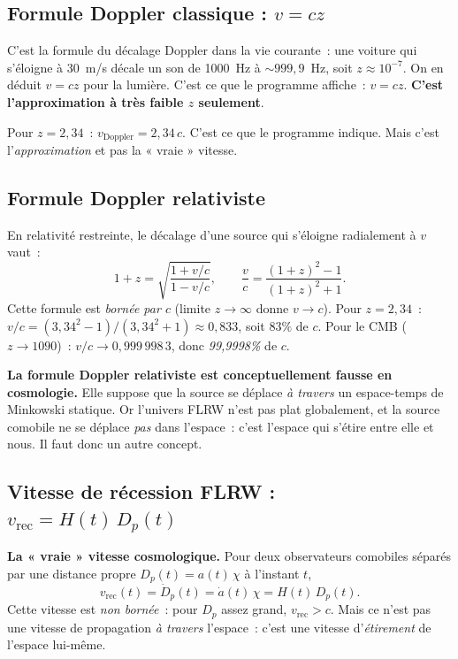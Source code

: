 \documentclass[11pt,a4paper,openany]{report}
\begin{document}
\subsection{Formule Doppler classique : $v = cz$}

\begin{tcolorbox}[vulgarisation]
C'est la formule du décalage Doppler dans la vie courante~: une voiture qui
s'éloigne à $30$~m/s décale un son de 1000~Hz à $\sim 999{,}9$~Hz, soit
$z\approx 10^{-7}$. On en déduit $v = cz$ pour la lumière. C'est ce que le
programme affiche~: $v = cz$. \textbf{C'est l'approximation à très faible $z$
seulement}.
\end{tcolorbox}

Pour $z=2{,}34$~: $v_{\text{Doppler}} = 2{,}34\,c$. C'est ce que le programme
indique. Mais c'est l'\emph{approximation} et pas la « vraie » vitesse.

\subsection{Formule Doppler relativiste}

En relativité restreinte, le décalage d'une source qui s'éloigne radialement
à $v$ vaut~:
\[
1 + z = \sqrt{\frac{1 + v/c}{1 - v/c}}, \qquad
\frac{v}{c} = \frac{(1+z)^{2} - 1}{(1+z)^{2} + 1}.
\]
Cette formule est \emph{bornée par $c$} (limite $z \to \infty$ donne $v\to c$).
Pour $z=2{,}34$~: $v/c = (3{,}34^{2}-1)/(3{,}34^{2}+1) \approx 0{,}833$, soit
$83\%$ de $c$. Pour le CMB ($z\to 1090$)~: $v/c \to 0{,}999\,998\,3$, donc
\emph{99{,}9998\%} de $c$.

\begin{tcolorbox}[attention]
\textbf{La formule Doppler relativiste est conceptuellement fausse en
cosmologie.} Elle suppose que la source se déplace \emph{à travers} un
espace-temps de Minkowski statique. Or l'univers FLRW n'est pas plat
globalement, et la source comobile ne se déplace \emph{pas} dans l'espace~:
c'est l'espace qui s'étire entre elle et nous. Il faut donc un autre concept.
\end{tcolorbox}

\subsection{Vitesse de récession FLRW : $v_{\text{rec}} = H(t)\,D_p(t)$}

\begin{tcolorbox}[mathspe]
\textbf{La « vraie » vitesse cosmologique.} Pour deux observateurs comobiles
séparés par une distance propre $D_p(t) = a(t)\,\chi$ à l'instant $t$,
\[
v_{\text{rec}}(t) = \dot D_p(t) = \dot a(t)\,\chi = H(t)\,D_p(t).
\]
Cette vitesse est \emph{non bornée}~: pour $D_p$ assez grand, $v_{\text{rec}} > c$.
Mais ce n'est pas une vitesse de propagation \emph{à travers} l'espace~: c'est
une vitesse d'\emph{étirement} de l'espace lui-même.
\end{tcolorbox}
\end{document}
